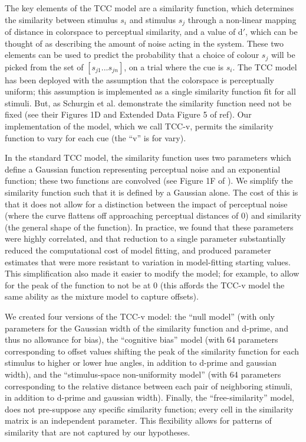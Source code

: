 The key elements of the TCC model are a similarity function, which determines the similarity between stimulus $s_i$ and stimulus $s_j$ through a non-linear mapping of distance in colorspace to perceptual similarity, and a value of d$\prime$, which can be thought of as describing the amount of noise acting in the system. These two elements can be used to predict the probability that a choice of colour $s_j$ will be picked from the set of $\left[s_{j1}...s_{jn}\right]$, on a trial where the cue is $s_i$. 
The TCC model has been deployed with the assumption that the colorspace is perceptually uniform; this assumption is implemented as a single similarity function fit for all stimuli. 
But, as Schurgin et al. \citep{schurgin_psychophysical_2020} demonstrate the similarity function need not be fixed (see their Figures 1D and Extended Data Figure 5 of ref). 
Our implementation of the model, which we call TCC-v, permits the similarity function to vary for each cue (the “v” is for vary). 

In the standard TCC model, the similarity function uses two parameters which define a Gaussian function representing perceptual noise and an exponential function; these two functions are convolved (see Figure 1F of \citep{schurgin_psychophysical_2020}). 
We simplify the similarity function such that it is defined by a Gaussian alone. 
The cost of this is that it does not allow for a distinction between the impact of perceptual noise (where the curve flattens off approaching perceptual distances of 0) and similarity (the general shape of the function). 
In practice, we found that these parameters were highly correlated, and that reduction to a single parameter substantially reduced the computational cost of model fitting, and produced parameter estimates that were more resistant to variation in model-fitting starting values. This simplification also made it easier to modify the model; for example, to allow for the peak of the function to not be at 0 (this affords the TCC-v model the same ability as the mixture model to capture offsets).  

We created four versions of the TCC-v model: the “null model” (with only parameters for the Gaussian width of the similarity function and d-prime, and thus no allowance for bias), the “cognitive bias” model (with 64 parameters corresponding to offset values shifting the peak of the similarity function for each stimulus to higher or lower hue angles, in addition to d-prime and gaussian width), and the “stimulus-space non-uniformity model” (with 64 parameters corresponding to the relative distance between each pair of neighboring stimuli, in addition to d-prime and gaussian width). 
Finally, the “free-similarity” model, does not pre-suppose any specific similarity function; every cell in the similarity matrix is an independent parameter. 
This flexibility allows for patterns of similarity that are not captured by our hypotheses. 

